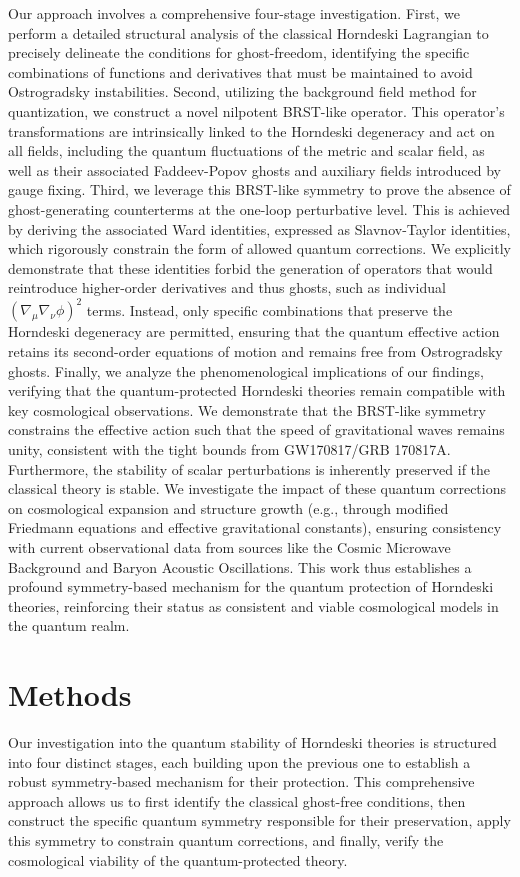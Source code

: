 \documentclass[twocolumn]{aastex631}
\begin{document}
Our approach involves a comprehensive four-stage investigation. First, we perform a detailed structural analysis of the classical Horndeski Lagrangian to precisely delineate the conditions for ghost-freedom, identifying the specific combinations of functions and derivatives that must be maintained to avoid Ostrogradsky instabilities. Second, utilizing the background field method for quantization, we construct a novel nilpotent BRST-like operator. This operator's transformations are intrinsically linked to the Horndeski degeneracy and act on all fields, including the quantum fluctuations of the metric and scalar field, as well as their associated Faddeev-Popov ghosts and auxiliary fields introduced by gauge fixing. Third, we leverage this BRST-like symmetry to prove the absence of ghost-generating counterterms at the one-loop perturbative level. This is achieved by deriving the associated Ward identities, expressed as Slavnov-Taylor identities, which rigorously constrain the form of allowed quantum corrections. We explicitly demonstrate that these identities forbid the generation of operators that would reintroduce higher-order derivatives and thus ghosts, such as individual $(\nabla_\mu\nabla_\nu\phi)^2$ terms. Instead, only specific combinations that preserve the Horndeski degeneracy are permitted, ensuring that the quantum effective action retains its second-order equations of motion and remains free from Ostrogradsky ghosts. Finally, we analyze the phenomenological implications of our findings, verifying that the quantum-protected Horndeski theories remain compatible with key cosmological observations. We demonstrate that the BRST-like symmetry constrains the effective action such that the speed of gravitational waves remains unity, consistent with the tight bounds from GW170817/GRB 170817A. Furthermore, the stability of scalar perturbations is inherently preserved if the classical theory is stable. We investigate the impact of these quantum corrections on cosmological expansion and structure growth (e.g., through modified Friedmann equations and effective gravitational constants), ensuring consistency with current observational data from sources like the Cosmic Microwave Background and Baryon Acoustic Oscillations. This work thus establishes a profound symmetry-based mechanism for the quantum protection of Horndeski theories, reinforcing their status as consistent and viable cosmological models in the quantum realm.


\section{Methods}
\label{sec:methods}
Our investigation into the quantum stability of Horndeski theories is structured into four distinct stages, each building upon the previous one to establish a robust symmetry-based mechanism for their protection. This comprehensive approach allows us to first identify the classical ghost-free conditions, then construct the specific quantum symmetry responsible for their preservation, apply this symmetry to constrain quantum corrections, and finally, verify the cosmological viability of the quantum-protected theory.
\end{document}
